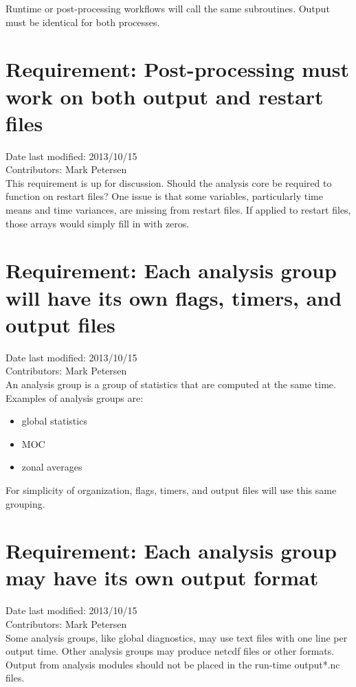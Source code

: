 \documentclass[11pt]{report}
\begin{document}
Runtime or post-processing workflows will call the same subroutines.  Output must be identical for both processes.

\section{Requirement: Post-processing must work on both output and restart files}
Date last modified: 2013/10/15 \\
Contributors: Mark Petersen \\

This requirement is up for discussion.  Should the analysis core be required to function on restart files?  One issue is that some variables, particularly time means and time variances, are missing from restart files.  If applied to restart files, those arrays would simply fill in with zeros.

\section{Requirement: Each analysis group will have its own flags, timers, and output files}
Date last modified: 2013/10/15 \\
Contributors: Mark Petersen \\

An analysis group is a group of statistics that are computed at the same time.  Examples of analysis groups are:
\begin{itemize}
\item global statistics
\item MOC
\item zonal averages
\end{itemize}
For simplicity of organization, flags, timers, and output files will use this same grouping.

\section{Requirement: Each analysis group may have its own output format}
Date last modified: 2013/10/15 \\
Contributors: Mark Petersen \\

Some analysis groups, like global diagnostics, may use text files with one line per output time.  Other analysis groups may produce netcdf files or other formats.  Output from analysis modules should not be placed in the run-time output*.nc files.
\end{document}
